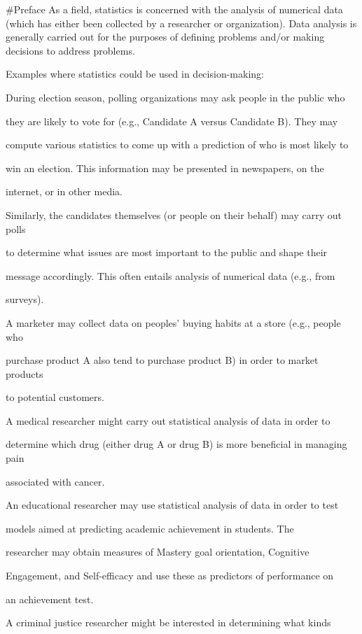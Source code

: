 \documentclass[
]{book}
\begin{document}
\#Preface
As a field, statistics is concerned with the analysis of numerical data (which has either
been collected by a researcher or organization). Data analysis is generally carried out for the purposes of defining problems and/or making decisions to address problems.

Examples where statistics could be used in decision-making:

During election season, polling organizations may ask people in the public who

they are likely to vote for (e.g., Candidate A versus Candidate B). They may

compute various statistics to come up with a prediction of who is most likely to

win an election. This information may be presented in newspapers, on the

internet, or in other media.

Similarly, the candidates themselves (or people on their behalf) may carry out polls

to determine what issues are most important to the public and shape their

message accordingly. This often entails analysis of numerical data (e.g., from

surveys).

A marketer may collect data on peoples' buying habits at a store (e.g., people who

purchase product A also tend to purchase product B) in order to market products

to potential customers.

A medical researcher might carry out statistical analysis of data in order to

determine which drug (either drug A or drug B) is more beneficial in managing pain

associated with cancer.

An educational researcher may use statistical analysis of data in order to test

models aimed at predicting academic achievement in students. The

researcher may obtain measures of Mastery goal orientation, Cognitive

Engagement, and Self-efficacy and use these as predictors of performance on

an achievement test.

A criminal justice researcher might be interested in determining what kinds
\end{document}
